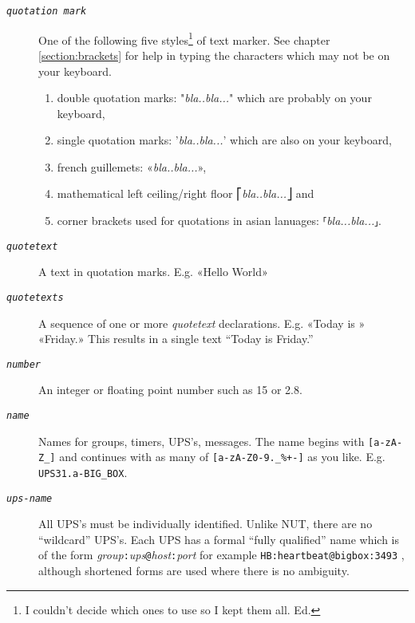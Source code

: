 \documentclass[12pt]{article}
\newcommand{\ttit}[1]{\texttt{\textit{#1}}}
\newcommand{\ol}{\begin{enumerate}%
   \setlength{\itemsep}{0em}}
\newcommand{\eol}{\end{enumerate}}
\newcommand{\li}{\item}                 %
\begin{document}
\begin{description}

\item[\ttit{quotation mark}] \hspace{7mm} One of the following five
  styles\footnote{I couldn't decide which ones to use so I kept them all. Ed.}
  of text marker.  See chapter \ref{section:brackets} for help in typing the
  characters which may not be on your keyboard.

\ol

\li double quotation marks: "\textit{bla..bla...}" which are probably on your
keyboard,

\li single quotation marks: '\textit{bla..bla...}'  which are also on your
keyboard,

\li french guillemets: «\textit{bla..bla...}»,

\li mathematical left ceiling/right floor ⎡\textit{bla..bla...}⎦ and 

\li corner brackets used for quotations in asian lanuages:
⸢\textit{bla...bla...}⸥.

\eol

\item[\ttit{quotetext}] \hspace{7mm} A text in quotation marks.  E.g. «Hello
  World»

\item[\ttit{quotetexts}] \hspace{7mm} A sequence of one or more
  \textit{quotetext} declarations.  E.g. «Today is » «Friday.» This results in
  a single text ``Today is Friday.''

\item[\ttit{number}] \hspace{7mm} An integer or floating point number such
  as 15 or 2.8.

\item[\ttit{name}] \hspace{7mm} Names for groups, timers, UPS's, messages.
  The name begins with \texttt{[a-zA-Z\_]} and continues with as many of
  \texttt{[a-zA-Z0-9.\_\%+-]} as you like.  E.g. \texttt{UPS31.a-BIG\_BOX}.

\item[\ttit{ups-name}] \hspace{7mm} All UPS's must be individually
  identified.  Unlike NUT, there are no ``wildcard'' UPS's.  Each UPS has a
  formal ``fully qualified'' name which is of the form
  \textit{group}\texttt{:}\textit{ups}\texttt{@}\textit{host}\texttt{:}\textit{port}
  for example \texttt{HB:heartbeat@bigbox:3493} , although shortened forms are
  used where there is no ambiguity.

\end{description}
\end{document}
